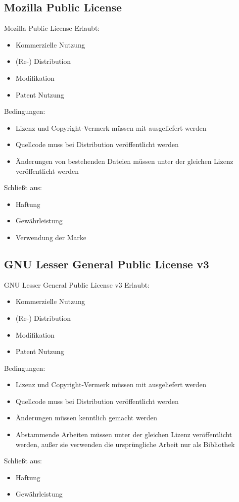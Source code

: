 \documentclass{beamer}
\begin{document}
\subsection{Mozilla Public License}
\begin{frame}{Mozilla Public License}
	Erlaubt:
	\begin{itemize}
		\item Kommerzielle Nutzung
		\item (Re-) Distribution
		\item Modifikation
		\item Patent Nutzung
	\end{itemize}

	Bedingungen:
	\begin{itemize}
		\item Lizenz und Copyright-Vermerk müssen mit ausgeliefert werden
		\item Quellcode muss bei Distribution veröffentlicht werden
		\item Änderungen von bestehenden Dateien müssen unter der gleichen
			Lizenz veröffentlicht werden
	\end{itemize}

	Schließt aus:
	\begin{itemize}
		\item Haftung
		\item Gewährleistung
		\item Verwendung der Marke
	\end{itemize}
\end{frame}

\subsection{GNU Lesser General Public License v3}
\begin{frame}{GNU Lesser General Public License v3}
	Erlaubt:
	\begin{itemize}
		\item Kommerzielle Nutzung
		\item (Re-) Distribution
		\item Modifikation
		\item Patent Nutzung
	\end{itemize}

	Bedingungen:
	\begin{itemize}
		\item Lizenz und Copyright-Vermerk müssen mit ausgeliefert werden
		\item Quellcode muss bei Distribution veröffentlicht werden
		\item Änderungen müssen kenntlich gemacht werden
		\item Abstammende Arbeiten müssen unter der gleichen
			Lizenz veröffentlicht werden, außer sie verwenden die ursprüngliche
			Arbeit nur als Bibliothek
	\end{itemize}

	Schließt aus:
	\begin{itemize}
		\item Haftung
		\item Gewährleistung
	\end{itemize}
\end{frame}
\end{document}
